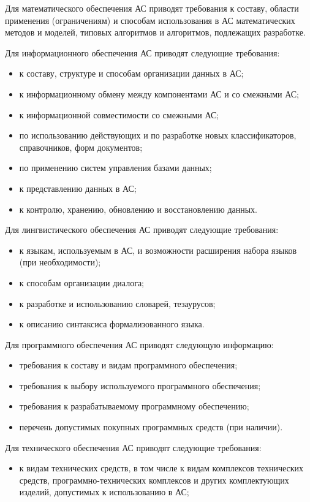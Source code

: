 {Для математического обеспечения АС приводят требования к составу, области применения (ограничениям) и способам использования в АС математических методов и моделей, типовых алгоритмов и алгоритмов, подлежащих разработке.

Для информационного обеспечения АС приводят следующие требования:
\begin{itemize}
  \item к составу, структуре и способам организации данных в АС;
  \item к информационному обмену между компонентами АС и со смежными АС;
  \item к информационной совместимости со смежными АС;
  \item по использованию действующих и по разработке новых классификаторов, справочников, форм документов;
  \item по применению систем управления базами данных;
  \item к представлению данных в АС;
  \item к контролю, хранению, обновлению и восстановлению данных.
\end{itemize}
Для лингвистического обеспечения АС приводят следующие требования:
\begin{itemize}
  \item к языкам, используемым в АС, и возможности расширения набора языков (при необходимости);
  \item к способам организации диалога;
  \item к разработке и использованию словарей, тезаурусов;
  \item к описанию синтаксиса формализованного языка.
\end{itemize}
Для программного обеспечения АС приводят следующую информацию:
\begin{itemize}
  \item требования к составу и видам программного обеспечения;
  \item требования к выбору используемого программного обеспечения;
  \item требования к разрабатываемому программному обеспечению;
  \item перечень допустимых покупных программных средств (при наличии).
\end{itemize}
Для технического обеспечения АС приводят следующие требования:
\begin{itemize}
  \item к видам технических средств, в том числе к видам комплексов технических средств, программно-технических комплексов и других комплектующих изделий, допустимых к использованию в АС;

\end{itemize}}
